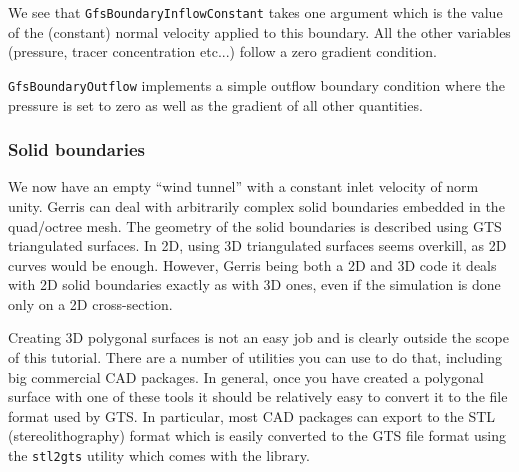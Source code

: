 \documentclass[a4paper]{article}
\begin{document}
We see that {\tt GfsBoundaryInflowConstant} takes one argument which is
the value of the (constant) normal velocity applied to this
boundary. All the other variables (pressure, tracer concentration
etc...) follow a zero gradient condition.

{\tt GfsBoundaryOutflow} implements a simple outflow boundary condition 
where the pressure is set to zero as well as the gradient of all other quantities.

\subsubsection{Solid boundaries}

We now have an empty ``wind tunnel'' with a constant inlet velocity of
norm unity. Gerris can deal with arbitrarily complex solid boundaries
embedded in the quad/octree mesh. The geometry of the solid boundaries
is described using {\sc GTS} triangulated surfaces. In 2D, using 3D
triangulated surfaces seems overkill, as 2D curves would be
enough. However, Gerris being both a 2D and 3D code it deals with 2D
solid boundaries exactly as with 3D ones, even if the simulation is
done only on a 2D cross-section.

Creating 3D polygonal surfaces is not an easy job and is clearly
outside the scope of this tutorial. There are a number of utilities
you can use to do that, including big commercial {\sc CAD}
packages. In general, once you have created a polygonal surface with
one of these tools it should be relatively easy to convert it to the
file format used by {\sc GTS}. In particular, most {\sc CAD} packages
can export to the {\sc STL} (stereolithography) format which is easily
converted to the {\sc GTS} file format using the {\tt stl2gts} utility
which comes with the library.
\end{document}
